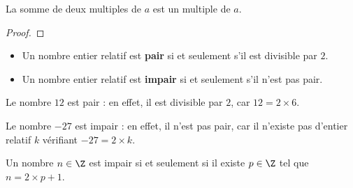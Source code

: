 \documentclass{article}
\begin{document}
\begin{proposition}
La somme de deux multiples de $a$ est un multiple de $a$.
\end{proposition}
\begin{proof}
\hfill
\vspace*{0.5cm}
\hfill
\emptybox{7cm}
\end{proof}
\newpage
\begin{definition}
\hfill
\begin{itemize}
\item Un nombre entier relatif est \textbf{pair} si et seulement s'il est divisible par $2$.
\item Un nombre entier relatif est \textbf{impair} si et seulement s'il n'est pas pair. 
\end{itemize}
\end{definition}
\begin{example}
\hfill

Le nombre $12$ est pair : en effet, il est divisible par $2$, car $12 = 2 \times 6$.

Le nombre $-27$ est impair : en effet, il n'est pas pair, car il n'existe pas d'entier relatif $k$ vérifiant $-27 = 2 \times k$.
\end{example}

\begin{proposition}
Un nombre $n \in \Z$ est impair si et seulement si il existe $p \in \Z$ tel que $n = 2 \times p + 1$.
\end{proposition}
\end{document}
